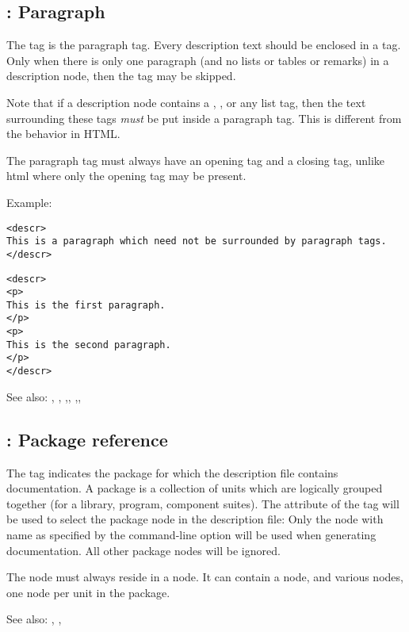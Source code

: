 \subsection{ : Paragraph}
\label{tag:p}
The  tag is the paragraph tag. Every description text should be 
enclosed in a  tag. Only when there is only one paragraph (and no
lists or tables or remarks) in a description node, then the  tag  may
be skipped.

Note that if a description node contains a , , 
or any list tag, then the text surrounding these tags {\em must} be  put 
inside a  paragraph tag. This is different from the behavior in HTML.

The paragraph tag must always have an opening tag and a closing tag, unlike
html where only the opening tag may be present.

Example:
\begin{verbatim}
<descr>
This is a paragraph which need not be surrounded by paragraph tags.
</descr>
\end{verbatim}
\begin{verbatim}
<descr>
<p>
This is the first paragraph.
</p>
<p>
This is the second paragraph.
</p>
</descr>
\end{verbatim}

See also: , , ,,
,,

\subsection{ : Package reference}
\label{tag:package}
The  tag indicates the package for which the description file
contains documentation. A package is a collection of units which are
logically grouped together (for a library, program, component suites). The
 attribute of the  tag will be used to select the
package node in the description file: Only the  node with name as
specified by the  command-line option will be used when
generating documentation. All other package nodes will be ignored.

The  node must always reside in a  node.
It can contain a  node, and various  nodes, one node
per unit in the package.

See also: , , 

